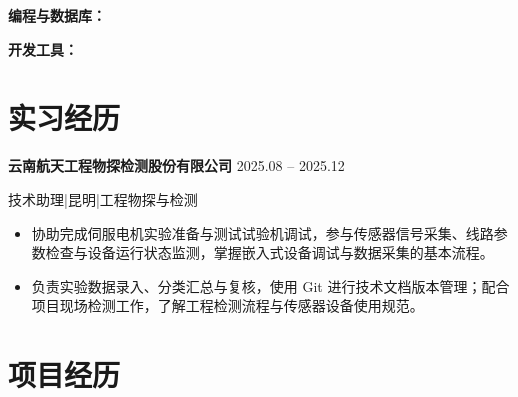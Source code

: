 \documentclass[10pt,a4paper]{article}
\begin{document}
\vspace{2pt}

{\bfseries\color{primary}编程与数据库：}

\vspace{2pt}

{\bfseries\color{primary}开发工具：}

\section{\faBriefcase\hspace{0.4em}实习经历}

{\bfseries 云南航天工程物探检测股份有限公司}\hfill{\color{graytext} 2025.08 -- 2025.12}

{\small\color{graytext}技术助理\hspace{0.3em}|\hspace{0.3em}昆明\hspace{0.3em}|\hspace{0.3em}工程物探与检测}

\vspace{2pt}

\begin{itemize}[leftmargin=1.5em, itemsep=2pt, parsep=0pt, topsep=2pt]
    \item 协助完成伺服电机实验准备与测试试验机调试，参与传感器信号采集、线路参数检查与设备运行状态监测，掌握嵌入式设备调试与数据采集的基本流程。
    \item 负责实验数据录入、分类汇总与复核，使用 Git 进行技术文档版本管理；配合项目现场检测工作，了解工程检测流程与传感器设备使用规范。
\end{itemize}

\vspace{0.15em}

\section{\faProjectDiagram\hspace{0.4em}项目经历}
\end{document}
